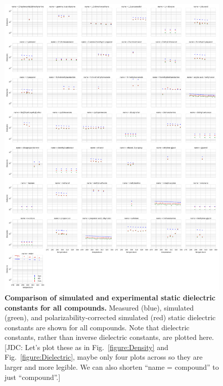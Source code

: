\documentclass[aps,pre,twocolumn,nofootinbib,superscriptaddress,linenumbers]{revtex4-1}
\begin{document}
\begin{figure}

\includegraphics[width=\textwidth]{./figures/dielectric_versus_temperature_all.pdf}

\caption{{\bf Comparison of simulated and experimental static dielectric constants for all compounds.}
Measured (blue), simulated (green), and polarizability-corrected simulated (red) static dielectric constants are shown for all compounds.
Note that dielectric constants, rather than inverse dielectric constants, are plotted here.
{\color{red}[JDC: Let's plot these as in Fig.~\ref{figure:Density} and Fig.~\ref{figure:Dielectric}, maybe only four plots across so they are larger and more legible.  We can also shorten ``name = compound'' to just ``compound''.]}
}
\label{figure:AllDielectrics}

\end{figure}

\end{document}
